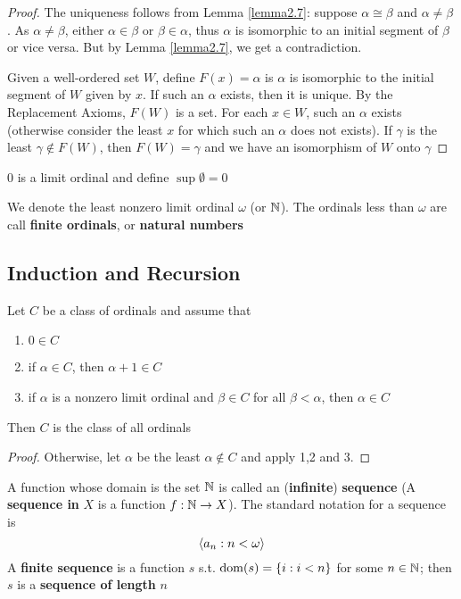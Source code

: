 \documentclass[11pt]{article}
\begin{document}
\begin{proof}
The uniqueness follows from Lemma \ref{lemma2.7}: suppose \(\alpha\cong\beta\) and \(\alpha\neq\beta\). As \(\alpha\neq\beta\),
either \(\alpha\in\beta\) or \(\beta\in\alpha\), thus \(\alpha\) is isomorphic to an initial segment of \(\beta\) or vice versa.
But by Lemma \ref{lemma2.7},  we get a contradiction.

Given a well-ordered set \(W\),
define \(F(x)=\alpha\) is \(\alpha\) is isomorphic to the initial segment of \(W\) given by \(x\). If such an
\(\alpha\) exists, then it is unique. By the Replacement Axioms, \(F(W)\) is a set. For each \(x\in W\),
such an \(\alpha\) exists (otherwise consider the least \(x\) for which such an \(\alpha\) does not exists). If
\(\gamma\) is the least \(\gamma\not\in F(W)\), then \(F(W)=\gamma\) and we have an isomorphism of \(W\) onto \(\gamma\)
\end{proof}

0 is a limit ordinal and define \(\sup\emptyset=0\)

\begin{definition}
We denote the least nonzero limit ordinal \(\omega\) (or \(\mathbb{N}\)). The ordinals less than \(\omega\) are call
\textbf{finite ordinals}, or \textbf{natural numbers}
\end{definition}

\subsection{Induction and Recursion}
\label{sec:orgd8523a7}
\begin{theorem}
Let \(C\) be a class of ordinals and assume that
\begin{enumerate}
\item \(0\in C\)
\item if \(\alpha\in C\), then \(\alpha+1\in C\)
\item if \(\alpha\) is a nonzero limit ordinal and \(\beta\in C\) for all \(\beta<\alpha\), then \(\alpha\in C\)
\end{enumerate}


Then \(C\) is the class of all ordinals
\end{theorem}

\begin{proof}
Otherwise, let \(\alpha\) be the least \(\alpha\not\in C\) and apply 1,2 and 3.
\end{proof}

A function whose domain is the set \(\mathbb{N}\) is called an (\textbf{infinite}) \textbf{sequence} (A \textbf{sequence in} \(X\)
is a function \(f:\mathbb{N}\to X\)). The standard notation for a sequence is
\begin{equation*}
\langle a_n:n<\omega\rangle
\end{equation*}
A \textbf{finite sequence} is a function \(s\) s.t. \(\operatorname{dom}(s)=\{i:i<n\}\) for some \(n\in\mathbb{N}\); then \(s\) is a
\textbf{sequence  of length} \(n\)
\end{document}
